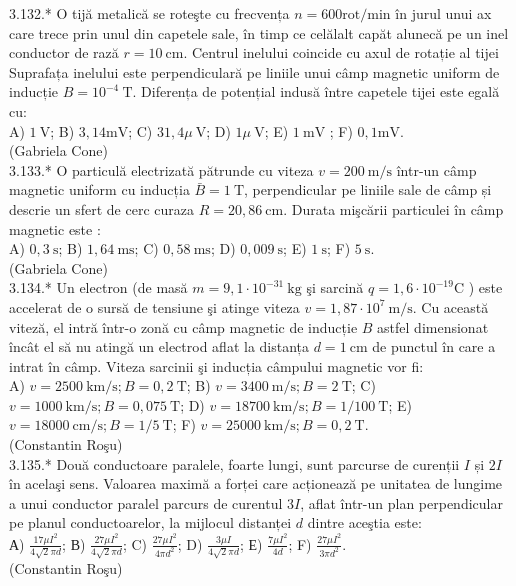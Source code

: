 \documentclass[10pt]{article}
\begin{document}
3.132.* O tijă metalică se roteşte cu frecvența $n=600 \mathrm{rot} / \mathrm{min}$ în jurul unui ax care trece prin unul din capetele sale, în timp ce celălalt capăt alunecă pe un inel conductor de rază $r=10 \mathrm{~cm}$. Centrul inelului coincide cu axul de rotație al tijei Suprafața inelului este perpendiculară pe liniile unui câmp magnetic uniform de inducție $B=10^{-4} \mathrm{~T}$. Diferența de potențial indusă între capetele tijei este egală cu:\\ A) $1 \mathrm{~V}$; B) $3,14 \mathrm{mV}$; C) $31,4 \mu \mathrm{~V}$; D) $1 \mu \mathrm{~V}$; E) $1 \mathrm{~mV}$ ; F) $0,1 \mathrm{mV}$.\\ (Gabriela Cone)\\

3.133.* O particulă electrizată pătrunde cu viteza $v=200 \mathrm{~m} / \mathrm{s}$ într-un câmp magnetic uniform cu inducția $\bar{B}=1 \mathrm{~T}$, perpendicular pe liniile sale de câmp și descrie un sfert de cerc curaza $R=20,86 \mathrm{~cm}$. Durata mişcării particulei în câmp magnetic este :\\ A) $0,3 \mathrm{~s}$; B) $1,64 \mathrm{~ms}$; C) $0,58 \mathrm{~ms}$; D) $0,009 \mathrm{~s}$; E) $1 \mathrm{~s}$; F) $5 \mathrm{~s}$.\\ (Gabriela Cone)\\

3.134.* Un electron (de masă $m=9,1 \cdot 10^{-31} \mathrm{~kg}$ şi sarcină $q=1,6 \cdot 10^{-19} \mathrm{C}$ ) este accelerat de o sursă de tensiune şi atinge viteza $v=1,87 \cdot 10^{7} \mathrm{~m} / \mathrm{s}$. Cu această viteză, el intră într-o zonă cu câmp magnetic de inducție $B$ astfel dimensionat încât el să nu atingă un electrod aflat la distanța $d=1 \mathrm{~cm}$ de punctul în care a intrat în câmp. Viteza sarcinii şi inducția câmpului magnetic vor fi:\\ A) $v=2500 \mathrm{~km} / \mathrm{s} ; B=0,2 \mathrm{~T}$; B) $v=3400 \mathrm{~m} / \mathrm{s} ; B=2 \mathrm{~T}$; C) $v=1000 \mathrm{~km} / \mathrm{s} ; B=0,075 \mathrm{~T}$; D) $v=18700 \mathrm{~km} / \mathrm{s} ; B=1 / 100 \mathrm{~T}$; E) $v=18000 \mathrm{~cm} / \mathrm{s} ; B=1 / 5 \mathrm{~T}$; F) $v=25000 \mathrm{~km} / \mathrm{s} ; B=0,2 \mathrm{~T}$.\\ (Constantin Roşu)\\

3.135.* Două conductoare paralele, foarte lungi, sunt parcurse de curenții $I$ și $2 I$ în acelaşi sens. Valoarea maximă a forței care acționează pe unitatea de lungime a unui conductor paralel parcurs de curentul $3 I$, aflat într-un plan perpendicular pe planul conductoarelor, la mijlocul distanței $d$ dintre aceştia este:\\ А) $\frac{17 \mu I^{2}}{4 \sqrt{2} \pi d}$; В) $\frac{27 \mu I^{2}}{4 \sqrt{2} \pi d}$; C) $\frac{27 \mu I^{2}}{4 \pi d^{2}}$; D) $\frac{3 \mu I}{4 \sqrt{2} \pi d}$; Е) $\frac{7 \mu I^{2}}{4 d}$; F) $\frac{27 \mu I^{2}}{3 \pi d^{2}}$.\\ (Constantin Roşu)\\
\end{document}
